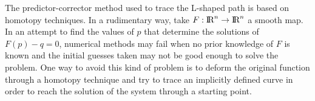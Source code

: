 \documentclass[journal=iecred,manuscript=article]{achemso}
\theoremstyle{definition}
\theoremstyle{remark}
\begin{document}
The predictor-corrector method used to trace the L-shaped path is based on homotopy techniques. 
%
%
In a rudimentary way, take $ F:\text{I\!R}^{n} \to \text{I\!R}^{n} $ a smooth map. In an attempt to find the values of $ p $ that determine the solutions of $ F\left(p\right) - q = 0 $, numerical methods may fail when no prior knowledge of $ F $ is known and the initial guesses taken may not be good enough to solve the problem. One way to avoid this kind of problem is to deform the original function through a homotopy technique and try to trace an implicitly defined curve in order to reach the solution of the system through a starting point.
%
%
%
\end{document}
